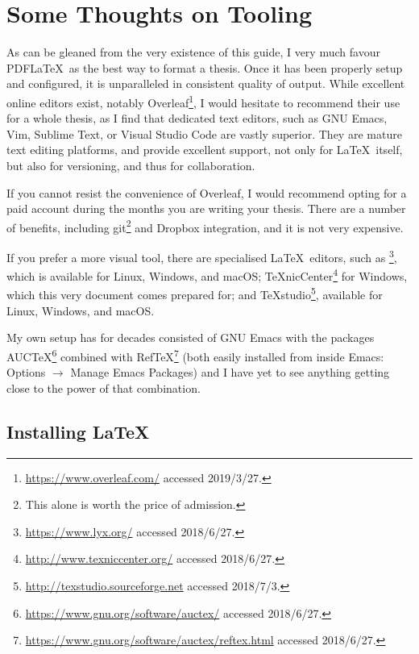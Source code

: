 
\chapter*{Some Thoughts on Tooling}
\label{cha:some-thoughts-tool}


As can be gleaned from the very existence of this guide, I very much favour PDF\LaTeX\ as the best way to format a thesis.
Once it has been properly setup and configured, it is unparalleled in consistent quality of output.
While excellent online editors exist, notably Overleaf\footnote{\url{https://www.overleaf.com/} accessed 2019/3/27.}, I would hesitate to recommend their use for a whole thesis, as I find that dedicated text editors, such as GNU Emacs, Vim, Sublime Text, or Visual Studio Code are vastly superior.
They are mature text editing platforms, and provide excellent support, not only for \LaTeX\ itself, but also for versioning, and thus for collaboration.

If you cannot resist the convenience of Overleaf, I would recommend opting for a paid account during the months you are writing your thesis. There are a number of benefits, including git\footnote{This alone is worth the price of admission.} and Dropbox integration, and it is not very expensive.

If you prefer a more visual tool, there are specialised \LaTeX\ editors, such as  \mLyX\footnote{\url{https://www.lyx.org/} accessed 2018/6/27.}, which is available for Linux, Windows, and macOS; \TeX nicCenter\footnote{\url{http://www.texniccenter.org/} accessed 2018/6/27.} for Windows, which this very document comes prepared for; and \TeX studio\footnote{\url{http://texstudio.sourceforge.net} accessed 2018/7/3.}, available for Linux, Windows, and macOS.

My own setup has for decades consisted of GNU Emacs with the packages AUC\TeX\footnote{\url{https://www.gnu.org/software/auctex/} accessed 2018/6/27.} combined with Ref\TeX\footnote{\url{https://www.gnu.org/software/auctex/reftex.html} accessed 2018/6/27.} (both easily installed from inside Emacs: Options $\rightarrow$ Manage Emacs Packages) and I have yet to see anything getting close to the power of that combination.

\section*{Installing \LaTeX}
\label{sec:installing-latex}

